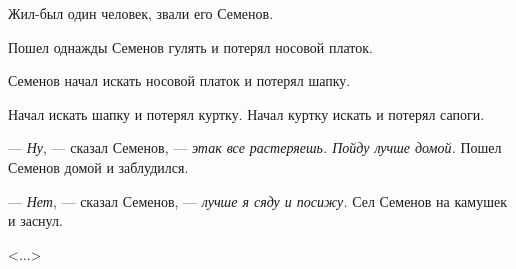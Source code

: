 Жил-был один человек, звали его Семенов.

Пошел однажды Семенов гулять и потерял носовой платок.

Семенов начал искать носовой платок и потерял шапку.

Начал искать шапку и потерял куртку. Начал куртку искать и потерял сапоги.

--- \textit{Ну}, --- сказал Семенов, --- \textit{этак все растеряешь. Пойду лучше домой.} Пошел Семенов домой и заблудился.

--- \textit{Нет}, --- сказал Семенов, --- \textit{лучше я сяду и посижу.} Сел Семенов на камушек и заснул.

\hfill <...>